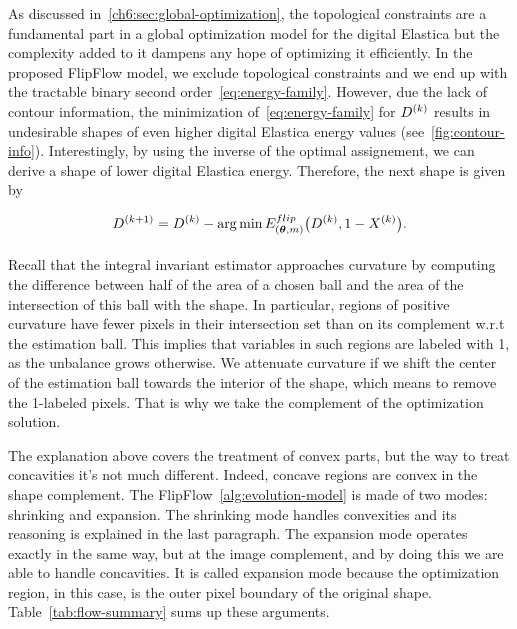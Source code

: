 As discussed in~\cref{ch6:sec:global-optimization}, the topological constraints are a fundamental part in a global optimization model for the digital Elastica but the complexity added to it dampens any hope of optimizing it efficiently. In the proposed FlipFlow model, we exclude topological constraints and we end up with the tractable binary second order~\cref{eq:energy-family}. However, due the lack of contour information, the minimization of~\cref{eq:energy-family} for $D^{(k)}$ results in undesirable shapes of even higher digital Elastica energy values  (see~\cref{fig:contour-info}). Interestingly, by using the inverse of the optimal assignement, we can derive a shape of lower digital Elastica energy. Therefore, the next shape is given by

\begin{align*}
	D^{(k+1)} = D^{(k)} - \operatorname*{arg\,min} _{}{E_{(\bm{\theta},m)}^{flip}\big(D^{(k)},1-X^{(k)}} \big).
\end{align*}

Recall that the integral invariant estimator approaches curvature by computing the difference between half of the area
of a chosen ball and the area of the intersection of this ball with the shape.  In particular, regions of positive
curvature have fewer pixels in their intersection set than on its complement w.r.t the estimation ball. This implies
that variables in such regions are labeled with 1, as the unbalance grows otherwise. We attenuate curvature if we shift
the center of the estimation ball towards the interior of the shape, which means to remove the 1-labeled pixels. That is
why we take the complement of the optimization solution.


The explanation above covers the treatment of convex parts, but the way to treat concavities it's not much different. Indeed, concave regions are convex in the shape complement. The FlipFlow~\cref{alg:evolution-model} is made of two modes: shrinking and expansion. The shrinking mode handles convexities and its reasoning is explained in the last paragraph. The expansion mode operates exactly in the same way, but at the image complement, and by doing this we are able to handle
concavities. It is called expansion mode because the optimization region, in this case, is the outer pixel boundary of
the original shape. Table~\cref{tab:flow-summary} sums up these arguments.

%
	
